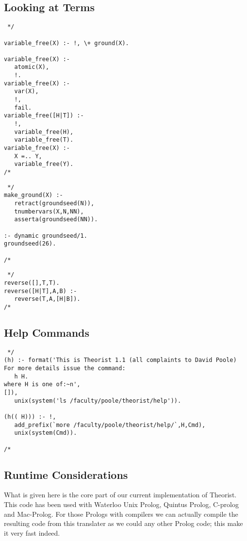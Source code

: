 \subsection{Looking at Terms}
\begin{verbatim} */

variable_free(X) :- !, \+ ground(X).

variable_free(X) :-
   atomic(X),
   !.
variable_free(X) :-
   var(X),
   !,
   fail.
variable_free([H|T]) :-
   !,
   variable_free(H),
   variable_free(T).
variable_free(X) :-
   X =.. Y,
   variable_free(Y).
/* \end{verbatim}

\begin{verbatim} */
make_ground(X) :-
   retract(groundseed(N)),
   tnumbervars(X,N,NN),
   asserta(groundseed(NN)).

:- dynamic groundseed/1.
groundseed(26).

/* \end{verbatim}

\begin{verbatim} */
reverse([],T,T).
reverse([H|T],A,B) :-
   reverse(T,A,[H|B]).
/* \end{verbatim}

\subsection{Help Commands}
\begin{verbatim} */
(h) :- format('This is Theorist 1.1 (all complaints to David Poole)
For more details issue the command:
   h H.
where H is one of:~n',
[]),
   unix(system('ls /faculty/poole/theorist/help')).

(h(( H))) :- !,
   add_prefix(`more /faculty/poole/theorist/help/`,H,Cmd),
   unix(system(Cmd)).

/* \end{verbatim}

\subsection{Runtime Considerations}
What is given here is the core part of our current implementation of
Theorist.
This code has been used with Waterloo Unix Prolog, Quintus Prolog,
C-prolog and Mac-Prolog.
For those Prologs with compilers we can actually compile the resulting
code from this translater as we could any other Prolog code;
this make it very fast indeed.

